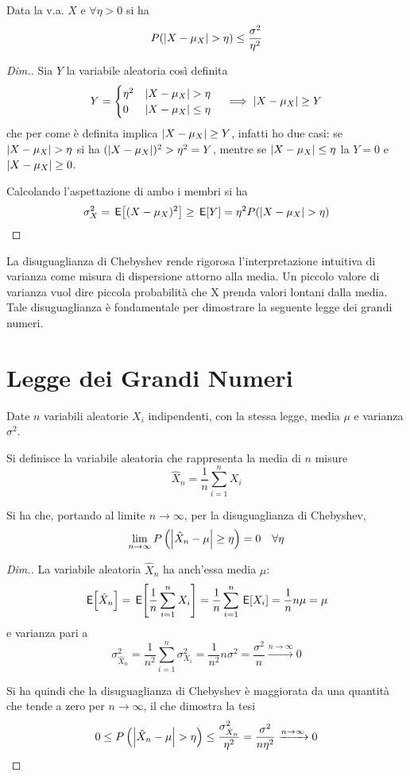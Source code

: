 Data la v.a. $X$ e $\forall\eta>0$ si ha
\begin{equation}
	P(\abs{X-\mu_X}>\eta)\leq\frac{\sigma^2}{\eta^2}
\end{equation}
\begin{proof}[Dim.]
Sia $Y$ la variabile aleatoria così definita
\[
	Y=\begin{cases}\eta^2&\abs{X-\mu_X}>\eta\\0&\abs{X-\mu_X}\leq\eta\end{cases}\quad\implies\abs{X-\mu_X}\geq Y
\]
che per come è definita implica $\left|{X-\mu_X}\right|\geq Y$, infatti ho due casi: se $\abs{X-\mu_X}>\eta$ si ha $(\left|{X-\mu_X}\right|)^2>\eta^2=Y$, mentre se $\left|{X-\mu_X}\right|\leq\eta$ la $Y=0$ e $\left|{X-\mu_X}\right|\geq 0$.

Calcolando l'aspettazione di ambo i membri si ha
\[
	\sigma^2_X=\E{(X-\mu_X)^2}\geq \E{Y}=\eta^2 P(\abs{X-\mu_X}>\eta)
\]
\end{proof}

La disuguaglianza di Chebyshev rende rigorosa l'interpretazione intuitiva di varianza come misura di dispersione attorno alla media. Un piccolo valore di varianza vuol dire piccola probabilità che X prenda valori lontani dalla media.
Tale disuguaglianza è fondamentale per dimostrare la seguente legge dei grandi numeri.

\section{Legge dei Grandi Numeri}
Date $n$ variabili aleatorie $X_i$ indipendenti, con la stessa legge, media $\mu$ e varianza $\sigma^2$.

Si definisce la variabile aleatoria che rappresenta la media di $n$ misure
\[
	\hat{X}_n=\frac{1}{n}\sum_{i=1}^{n}X_i
\]

Si ha che, portando al limite $n\to\infty$, per la disuguaglianza di Chebyshev,
\begin{equation}
\label{eq:legge_grandi_numeri}
	\lim\limits_{n\to\infty} P\left(\left|{\hat{X}_n-\mu}\right|\geq\eta\right)=0\quad\forall\eta
\end{equation}

\begin{proof}[Dim.]
La variabile aleatoria $\hat{X}_n$ ha anch'essa media $\mu$:
\[
	\,{\operatorname{\mathsf{E}}}\!\left[{\hat{X}_n}\right]=\,{\operatorname{\mathsf{E}}}\!\left[{\frac{1}{n}\sum_{i=1}^{n}X_i}\right]=\frac{1}{n}\sum_{i=1}^{n}\,{\operatorname{\mathsf{E}}}\!\left[{X_i}\right]=\frac{1}{n}n\mu=\mu
\]
e varianza pari a
\[
	\sigma^2_{\hat{X}_n}=\frac{1}{n^2}\sum_{i=1}^{n}\sigma^2_{X_i}=\frac{1}{n^2}n\sigma^2=\frac{\sigma^2}{n}\xrightarrow{n\to\infty}0
\]

Si ha quindi che la disuguaglianza di Chebyshev è maggiorata da una quantità che tende a zero per $n\to\infty$, il che dimostra la tesi
\[
	0\leq P\left(\abs{\hat{X}_n-\mu}>\eta\right)\leq \frac{\sigma^2_{\hat{X}_n}}{\eta^2}=\frac{\sigma^2}{n\eta^2} \xrightarrow{n\to\infty}0
\]
\end{proof}

